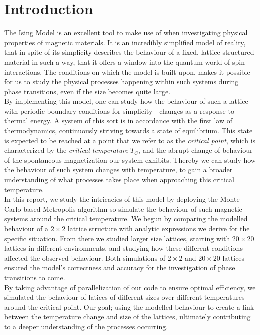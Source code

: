 \documentclass[10pt, nofootinbib, twocolumn]{revtex4-1}
\begin{document}
\section{Introduction}\label{sec:introduction}
The Ising Model is an excellent tool to make use of when investigating physical properties of magnetic materials. It is an incredibly simplified model of reality, that in spite of its simplicity describes the behaviour of a fixed, lattice structured material in such a way, that it offers a window into the quantum world of spin interactions. The conditions on which the model is built upon, makes it possible for us to study the physical processes happening within such systems during phase transitions, even if the size becomes quite large. \\

By implementing this model, one can study how the behaviour of such a lattice - with periodic boundary conditions for simplicity - changes as a response to thermal energy. A system of this sort is in accordance with the first law of thermodynamics, continuously striving towards a state of equilibrium. This state is expected to be reached at a point that we refer to as the \textit{critical point}, which is characterized by the \textit{critical temperature} $T_C$, and the abrupt change of behaviour of the spontaneous magnetization our system exhibits. Thereby we can study how the behaviour of such system changes with temperature, to gain a broader understanding of what processes takes place when approaching this critical temperature. \\

In this report, we study the intricacies of this model by deploying the Monte Carlo based Metropolis algorithm so simulate the behaviour of such magnetic systems around the critical temperature. We begun by comparing the modelled behaviour of a $2\times 2$ lattice structure with analytic expressions we derive for the specific situation. From there we studied larger size lattices, starting with $20\times 20$ lattices in different environments, and studying how these different conditions affected the observed behaviour. Both simulations of $2\times 2$ and $20\times 20$ lattices ensured the model's correctness and accuracy for the investigation of phase transitions to come. \\

By taking advantage of parallelization of our code to ensure optimal efficiency, we simulated the behaviour of latices of different sizes over different temperatures around the critical point. Our goal; using the modelled behaviour to create a link between the temperature change and size of the lattices, ultimately contributing to a deeper understanding of the processes occurring.
\end{document}
